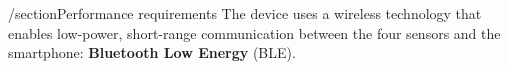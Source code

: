 /section{Performance requirements}
The device uses a wireless technology that enables low-power, short-range communication
between the four sensors and the smartphone: \textbf{Bluetooth Low Energy} (BLE).\\
